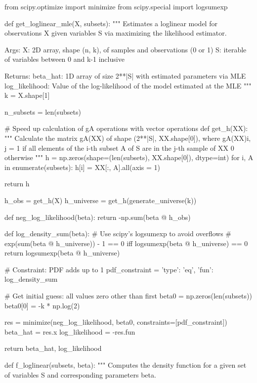\begin{python}
from scipy.optimize import minimize
from scipy.special import logsumexp

def get_loglinear_mle(X, subsets):
    """
    Estimates a loglinear model for observations X given variables S via maximizing the likelihood estimator.
    
    Args:
       X:  2D array, shape (n, k), of samples and observations (0 or 1)
       S:  iterable of variables between 0 and k-1 inclusive
       
    Returns:
       beta_hat:  1D array of size 2**|S| with estimated parameters via MLE
       log_likelihood:  Value of the log-likelihood of the model estimated at the MLE
    """
    k = X.shape[1]
    
    n_subsets = len(subsets)
    
    # Speed up calculation of gA operations with vector operations
    def get_h(XX):
        """
        Calculate the matrix gA(XX) of shape (2**|S|, XX.shape[0]), where
        gA(XX){i, j} = 1 if all elements of the i-th subset A of S are in the j-th sample of XX
                       0 otherwise
        """
        h = np.zeros(shape=(len(subsets), XX.shape[0]), dtype=int)
        for i, A in enumerate(subsets):
            h[i] = XX[:, A].all(axis = 1)
            
        return h
    
    h_obs = get_h(X)
    h_universe = get_h(generate_universe(k))
    
    def neg_log_likelihood(beta):
        return -np.sum(beta @ h_obs)
    
    def log_density_sum(beta):
        # Use scipy's logsumexp to avoid overflows
        # exp(sum(beta @ h_universe)) - 1 == 0 iff logsumexp(beta @ h_universe) == 0
        return logsumexp(beta @ h_universe)
    
    # Constraint: PDF adds up to 1
    pdf_constraint = {'type': 'eq', 'fun': log_density_sum}
    
    # Get initial guess: all values zero other than first
    beta0 = np.zeros(len(subsets))
    beta0[0] = -k * np.log(2)
    
    res = minimize(neg_log_likelihood, beta0, constraints=[pdf_constraint])
    beta_hat = res.x
    log_likelihood = -res.fun
    
    return beta_hat, log_likelihood


def f_loglinear(subsets, beta):
    """
    Computes the density function for a given set of variables S and corresponding parameters beta.
    

\end{python}
